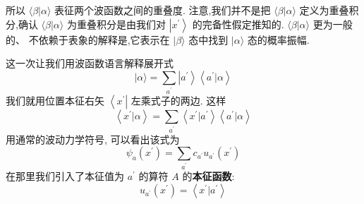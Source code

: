 \documentclass[lang=cn,newtx,10pt,scheme=chinese,thmcnt=section]{elegantbook}
\begin{document}
所以 $\langle \beta | \alpha \rangle$ 表征两个波函数之间的重叠度. 注意,我们并不是把 $\langle \beta | \alpha \rangle$ 定义为重叠积分,确认 $\langle \beta | \alpha \rangle$ 为重叠积分是由我们对 $\left| {x}^{\prime }\right\rangle$ 的完备性假定推知的. $\langle \beta | \alpha \rangle$ 更为一般的、 不依赖于表象的解释是,它表示在 $|\beta \rangle$ 态中找到 $|\alpha \rangle$ 态的概率振幅.

这一次让我们用波函数语言解释展开式
\begin{equation}
	| {\alpha \rangle = \mathop{\sum }\limits_{{a}^{\prime }}\left| {a}^{\prime }\right\rangle \left\langle {{a}^{\prime } | \alpha }\right\rangle }
\end{equation}
我们就用位置本征右矢 $\left\langle {x}^{\prime }\right|$ 左乘式子的两边. 这样
\begin{equation}
	\left\langle {{x}^{\prime } | \alpha }\right\rangle = \mathop{\sum }\limits_{{a}^{\prime }}\left\langle {{x}^{\prime } | {a}^{\prime }}\right\rangle \left\langle {{a}^{\prime } | \alpha }\right\rangle
\end{equation}
用通常的波动力学符号, 可以看出该式为
\begin{equation}
	{\psi }_{a}\left( {x}^{\prime }\right) = \mathop{\sum }\limits_{{a}^{\prime }}{c}_{{a}^{\prime }}{u}_{{a}^{\prime }}\left( {x}^{\prime }\right)
\end{equation}
在那里我们引入了本征值为 ${a}^{\prime }$ 的算符 $A$ 的\textbf{本征函数}:
\begin{equation}
	{u}_{{a}^{\prime }}\left( {x}^{\prime }\right) = \left\langle {{x}^{\prime } | {a}^{\prime }}\right\rangle
\end{equation}
\end{document}
